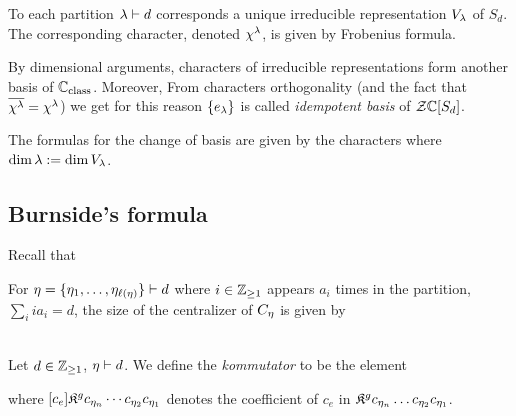 \documentclass[10pt]{beamer}
\begin{document}
\begin{frame}

\begin{theorem}
	To each partition $\lambda\vdash d$ corresponds a unique irreducible representation $V_\lambda$ of $S_d$. The corresponding character, denoted $\chi^\lambda$, is given by Frobenius formula.
\end{theorem}

By dimensional arguments, characters of irreducible representations form another basis of $\mathbb C_{\text{class}}$. Moreover, 
From characters orthogonality (and the fact that $\overline{\chi^\lambda}=\chi^\lambda$) we get
for this reason $\{e_\lambda\}$ is called \emph{idempotent basis} of $\mathcal Z\mathbb C[S_d]$.

The formulas for the change of basis are given by the characters
where $\dim \lambda:=\dim V_\lambda$. 

\end{frame}

\subsection{Burnside's formula}

\begin{frame}

Recall that 
\vspace{-3mm}

For $\eta=\{\eta_1,\ldots,\eta_{\ell(\eta)}\}\vdash d$ where $i\in\mathbb Z_{\geq1}$ appears $a_i$ times in the partition, $\sum_i ia_i=d$, the size of the centralizer of $C_\eta$ is given by\\[-8pt]
\\[-8pt]

\begin{definition}
	Let $d\in\mathbb Z_{\geq1}$, $\eta\vdash d$. We define the \emph{kommutator} to be the element
\end{definition}

\begin{theorem}
	where $[c_e]\mathfrak K^gc_{\eta_n}\cdots c_{\eta_2}c_{\eta_1}$ denotes the coefficient of $c_e$ in $\mathfrak K^gc_{\eta_n}\ldots c_{\eta_2}c_{\eta_1}$.
\end{theorem}
\end{frame}
\end{document}
